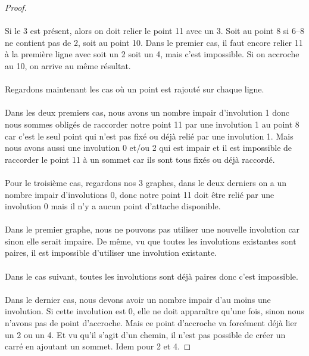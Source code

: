 \documentclass[a4paper]{article}
\theoremstyle{mytheorem}
\begin{document}
\begin{proof}
  \paragraph{}
  Si le 3 est présent, alors on doit relier le point 11 avec un 3. Soit au point 8 si 6--8 ne contient pas de 2, soit au point 10. Dans le premier cas, il faut encore relier 11 à la première ligne avec soit un 2 soit un 4, mais c'est impossible. Si on accroche au 10, on arrive au même résultat.


  \paragraph{}
  Regardons maintenant les cas où un point est rajouté sur chaque ligne.

  \paragraph{}
  Dans les deux premiers cas, nous avons un nombre impair d'involution 1 donc nous sommes obligés de raccorder notre point 11 par une involution 1 au point 8 car c'est le seul point qui n'est pas fixé ou déjà relié par une involution 1. Mais nous avons aussi une involution 0 et/ou 2 qui est impair et il est impossible de raccorder le point 11 à un sommet car ils sont tous fixés ou déjà raccordé.

  \paragraph{}
  Pour le troisième cas, regardons nos 3 graphes, dans le deux derniers on a un nombre impair d'involutions 0, donc notre point 11 doit être relié par une involution 0 mais il n'y a aucun point d'attache disponible.

  \paragraph{}
  Dans le premier graphe, nous ne pouvons pas utiliser une nouvelle involution car sinon elle serait impaire. De même, vu que toutes les involutions existantes sont paires, il est impossible d'utiliser une involution existante.

  \paragraph{}
  Dans le cas suivant, toutes les involutions sont déjà paires donc c'est impossible.

  \paragraph{}
  Dans le dernier cas, nous devons avoir un nombre impair d'au moins une involution. Si cette involution est 0, elle ne doit apparaître qu'une fois, sinon nous n'avons pas de point d'accroche. Mais ce point d'accroche va forcément déjà lier un 2 ou un 4. Et vu qu'il s'agit d'un chemin, il n'est pas possible de créer un carré en ajoutant un sommet. Idem pour 2 et 4.


\end{proof}
\end{document}
